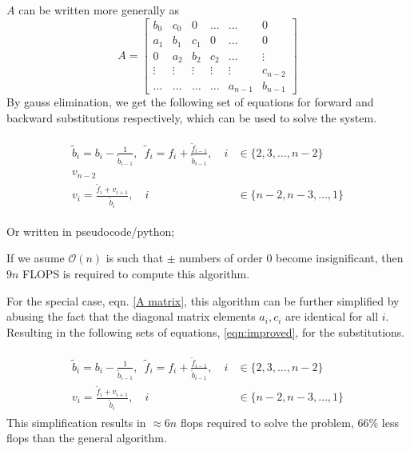 \documentclass[10pt,showpacs,preprintnumbers,footinbib,amsmath,amssymb,aps,prl,twocolumn,groupedaddress,superscriptaddress,showkeys]{revtex4-1}
\begin{document}
  $A$ can be written more generally as
  \begin{equation}
    \label{A matrix general}
    A = \left[ 
    \begin{matrix}
      b_0 & c_0 & 0 & \dots  & \dots &0 \\
      a_1 & b_1 & c_1 & 0 & \dots &  0 \\
      0 & a_2 & b_2 & c_2 & \dots & \vdots  \\
      \vdots & \vdots & \vdots & \vdots & \vdots & c_{n-2}\\
      \dots & \dots & \dots & \dots & a_{n-1} & b_{n-1}
    \end{matrix}
    \right]
  \end{equation}
  By gauss elimination, we get the following set of equations for forward and backward substitutions respectively, which can be used to solve the system.

    \begin{align}
    \begin{split}
      \label{eqn:improved}
      \tilde b_i = b_i - \frac{1}{\tilde b_{i-1}}, 
      \enspace
      \tilde f_i = f_i + \frac{\tilde f_{i -1}}{\tilde b_{i-1}}, 
      \quad i &\in \{2, 3, \dots, n-2\} 
      \\

      v_{n-2}

      \\
      v_i = \frac{\tilde f_i + v_{i+1}}{\tilde b_i}, 
      \quad i &\in \{n-2, n-3, \dots, 1\}
    \end{split}
  \end{align}


  Or written in pseudocode/python;
  

  If we asume $\mathcal O(n)$ is such that $\pm$ numbers of order 0 become insignificant, then $9n$ FLOPS is required to compute this algorithm.

  For the special case, eqn. \ref{A matrix}, this algorithm can be further simplified by abusing the fact that the diagonal matrix elements $a_i, c_i$ are identical for all $i$. Resulting in the following sets of equations, \ref{eqn:improved}, for the substitutions.

  \begin{align}
    \begin{split}
      \label{eqn:improved}
      \tilde b_i = b_i - \frac{1}{\tilde b_{i-1}}, 
      \enspace
      \tilde f_i = f_i + \frac{\tilde f_{i -1}}{\tilde b_{i-1}}, 
      \quad i &\in \{2, 3, \dots, n-2\} 
      \\
      v_i = \frac{\tilde f_i + v_{i+1}}{\tilde b_i}, 
      \quad i &\in \{n-2, n-3, \dots, 1\}
    \end{split}
  \end{align}
  This simplification results in $\approx 6n$ flops required to solve the problem, $66\%$ less flops than the general algorithm.
\end{document}
